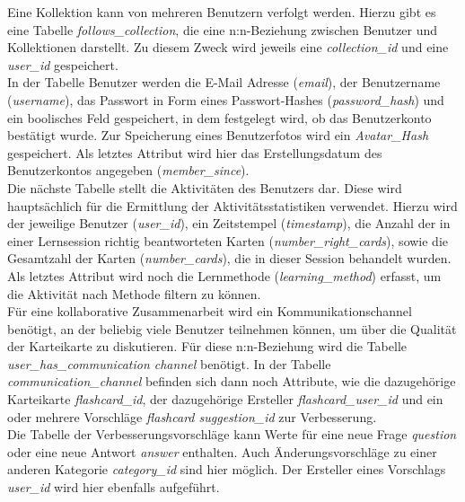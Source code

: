 \noindent Eine Kollektion kann von mehreren Benutzern verfolgt werden. Hierzu gibt es eine Tabelle \emph{follows{\_}collection}, die eine n:n-Beziehung zwischen Benutzer und Kollektionen darstellt. Zu diesem Zweck wird jeweils eine \emph{collection{\_}id} und eine \emph{user{\_}id} gespeichert. \\

\noindent In der Tabelle Benutzer werden die E-Mail Adresse (\emph{email}), der Benutzername (\emph{username}), das Passwort in Form eines Passwort-Hashes (\emph{password{\_}hash}) und ein boolisches Feld gespeichert, in dem festgelegt wird, ob das Benutzerkonto bestätigt wurde. Zur Speicherung eines Benutzerfotos wird ein \emph{Avatar{\_}Hash} gespeichert. Als letztes Attribut wird hier das Erstellungsdatum des Benutzerkontos angegeben (\emph{member{\_}since}). \\

\noindent Die nächste Tabelle stellt die Aktivitäten des Benutzers dar. Diese wird hauptsächlich für die Ermittlung der Aktivitätsstatistiken verwendet. Hierzu wird der jeweilige Benutzer (\emph{user{\_}id}), ein Zeitstempel (\emph{timestamp}), die Anzahl der in einer Lernsession richtig beantworteten Karten (\emph{number{\_}right{\_}cards}), sowie die Gesamtzahl der Karten (\emph{number{\_}cards}), die in dieser Session behandelt wurden. Als letztes Attribut wird noch die Lernmethode (\emph{learning{\_}method}) erfasst, um die Aktivität nach Methode filtern zu können. \\

\noindent Für eine kollaborative Zusammenarbeit wird ein Kommunikationschannel benötigt, an der beliebig viele Benutzer teilnehmen können, um über die Qualität der Karteikarte zu diskutieren. Für diese n:n-Beziehung wird die Tabelle \emph{user{\_}has{\_}communication channel} benötigt. In der Tabelle \emph{communication{\_}channel} befinden sich dann noch Attribute, wie die dazugehörige Karteikarte \emph{flashcard{\_}id}, der dazugehörige Ersteller \emph{flashcard{\_}user{\_}id} und ein oder mehrere Vorschläge \emph{flashcard suggestion{\_}id} zur Verbesserung. \\

\noindent Die Tabelle der Verbesserungsvorschläge kann Werte für eine neue Frage \emph{question} oder eine neue Antwort \emph{answer} enthalten. Auch Änderungsvorschläge zu einer anderen Kategorie \emph{category{\_}id} sind hier möglich. Der Ersteller eines Vorschlags \emph{user{\_}id} wird hier ebenfalls aufgeführt.


